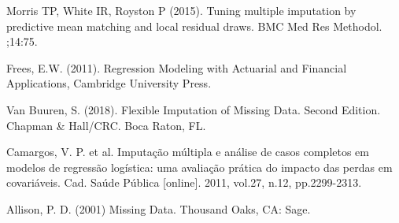 \documentclass[]{article}
\begin{document}
Morris TP, White IR, Royston P (2015). Tuning multiple imputation by
predictive mean matching and local residual draws. BMC Med Res Methodol.
;14:75.

Frees, E.W. (2011). Regression Modeling with Actuarial and Financial
Applications, Cambridge University Press.

Van Buuren, S. (2018). Flexible Imputation of Missing Data. Second
Edition. Chapman \& Hall/CRC. Boca Raton, FL.

Camargos, V. P. et al. Imputação múltipla e análise de casos completos
em modelos de regressão logística: uma avaliação prática do impacto das
perdas em covariáveis. Cad. Saúde Pública {[}online{]}. 2011, vol.27,
n.12, pp.2299-2313.

Allison, P. D. (2001) Missing Data. Thousand Oaks, CA: Sage.
\end{document}
